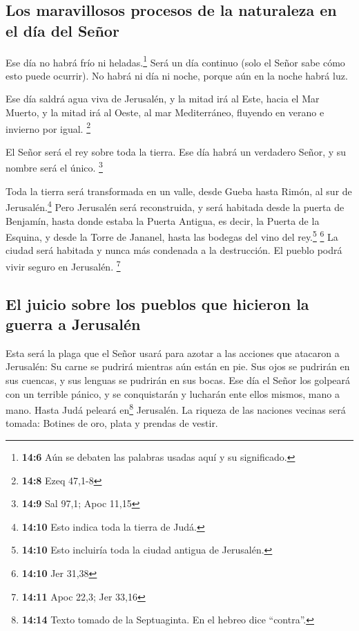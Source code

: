 \hypertarget{los-maravillosos-procesos-de-la-naturaleza-en-el-duxeda-del-seuxf1or}{%
\subsection{Los maravillosos procesos de la naturaleza en el día del
Señor}\label{los-maravillosos-procesos-de-la-naturaleza-en-el-duxeda-del-seuxf1or}}

 Ese día no habrá frío ni heladas.\footnote{\textbf{14:6}
  Aún se debaten las palabras usadas aquí y su significado.}
 Será un día continuo (solo el Señor sabe cómo esto puede
ocurrir). No habrá ni día ni noche, porque aún en la noche habrá luz.

 Ese día saldrá agua viva de Jerusalén, y la mitad irá al
Este, hacia el Mar Muerto, y la mitad irá al Oeste, al mar Mediterráneo,
fluyendo en verano e invierno por igual. \footnote{\textbf{14:8} Ezeq
  47,1-8}

 El Señor será el rey sobre toda la tierra. Ese día habrá
un verdadero Señor, y su nombre será el único. \footnote{\textbf{14:9}
  Sal 97,1; Apoc 11,15}

 Toda la tierra será transformada en un valle, desde
Gueba hasta Rimón, al sur de Jerusalén.\footnote{\textbf{14:10} Esto
  indica toda la tierra de Judá.} Pero Jerusalén será reconstruida, y
será habitada desde la puerta de Benjamín, hasta donde estaba la Puerta
Antigua, es decir, la Puerta de la Esquina, y desde la Torre de Jananel,
hasta las bodegas del vino del rey.\footnote{\textbf{14:10} Esto
  incluiría toda la ciudad antigua de Jerusalén.} \footnote{\textbf{14:10}
  Jer 31,38}  La ciudad será habitada y nunca más
condenada a la destrucción. El pueblo podrá vivir seguro en Jerusalén.
\footnote{\textbf{14:11} Apoc 22,3; Jer 33,16}

\hypertarget{el-juicio-sobre-los-pueblos-que-hicieron-la-guerra-a-jerusaluxe9n}{%
\subsection{El juicio sobre los pueblos que hicieron la guerra a
Jerusalén}\label{el-juicio-sobre-los-pueblos-que-hicieron-la-guerra-a-jerusaluxe9n}}

 Esta será la plaga que el Señor usará para azotar a las
acciones que atacaron a Jerusalén: Su carne se pudrirá mientras aún
están en pie. Sus ojos se pudrirán en sus cuencas, y sus lenguas se
pudrirán en sus bocas.  Ese día el Señor los golpeará con
un terrible pánico, y se conquistarán y lucharán ente ellos mismos, mano
a mano.  Hasta Judá peleará en\footnote{\textbf{14:14}
  Texto tomado de la Septuaginta. En el hebreo dice ``contra''.}
Jerusalén. La riqueza de las naciones vecinas será tomada: Botines de
oro, plata y prendas de vestir.

